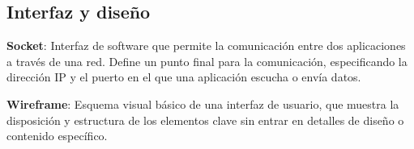 \vspace{5mm}


\subsection{Interfaz y diseño}
\textbf{Socket}: Interfaz de software que permite la comunicación entre dos aplicaciones a través de una red. Define un punto final para la comunicación, especificando la dirección IP y el puerto en el que una aplicación escucha o envía datos.

\vspace{5mm}

\textbf{Wireframe}: Esquema visual básico de una interfaz de usuario, que muestra la disposición y estructura de los elementos clave sin entrar en detalles de diseño o contenido específico.

\vspace{5mm}

